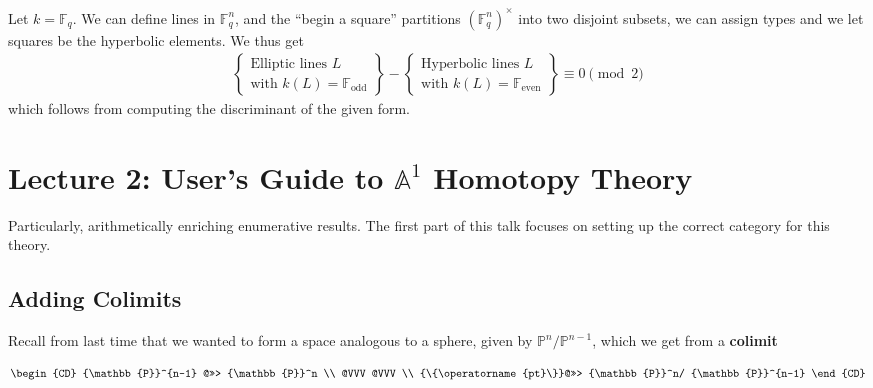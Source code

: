 \begin{example}

Let \(k={\mathbb{F}}_q\). We can define lines in \({\mathbb{F}}_q^n\),
and the ``begin a square'' partitions \(({\mathbb{F}}_q^n)^\times\) into
two disjoint subsets, we can assign types and we let squares be the
hyperbolic elements. We thus get
\begin{align*}
\left\{\begin{array}{c}
\text{Elliptic lines $L$ } \\
\text{with $k(L) = {\mathbb{F}}_\text{odd}$}
\end{array}\right\} -
\left\{\begin{array}{c}
\text{Hyperbolic lines $L$} \\
\text{with $k(L) = {\mathbb{F}}_\text{even}$}
\end{array}\right\}
\equiv 0 \pmod 2
\end{align*}
which follows from computing the discriminant of the given form.

\end{example}

\hypertarget{lecture-2-users-guide-to-mathbba1-homotopy-theory}{%
\section{\texorpdfstring{Lecture 2: User's Guide to \({\mathbb{A}}^1\)
Homotopy
Theory}{Lecture 2: User's Guide to \{\textbackslash mathbb\{A\}\}\^{}1 Homotopy Theory}}\label{lecture-2-users-guide-to-mathbba1-homotopy-theory}}

Particularly, arithmetically enriching enumerative results. The first
part of this talk focuses on setting up the correct category for this
theory.

\hypertarget{adding-colimits}{%
\subsection{Adding Colimits}\label{adding-colimits}}

Recall from last time that we wanted to form a space analogous to a
sphere, given by \({\mathbb{P}}^n/ {\mathbb{P}}^{n-1}\), which we get
from a \textbf{colimit}

\begin{align*}
\begin{CD}
  {\mathbb{P}}^{n-1} @>>> {\mathbb{P}}^n \\
  @VVV @VVV \\
  {\{\operatorname{pt}\}}@>>> {\mathbb{P}}^n/ {\mathbb{P}}^{n-1}
\end{CD}
\end{align*}

